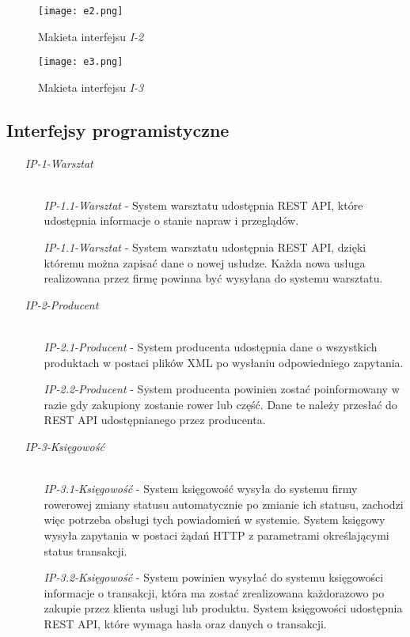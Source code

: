 \documentclass[a4paper,20pt]{article}
\begin{document}
\begin{figure}[H]
\centerline{\texttt{[image: e2.png]}}
\caption{Makieta interfejsu \textit{I-2}}
\label{e2}
\end{figure}

\begin{figure}[H]
\centerline{\texttt{[image: e3.png]}}
\caption{Makieta interfejsu \textit{I-3}}
\label{ekosys}
\end{figure}



\subsection{Interfejsy programistyczne}

\begin{itemize}

\item [\textit{IP-1-Warsztat \\}] \mbox{} \\
\begin{itemize}
\item [\textit{IP-1.1-Warsztat}] - System warsztatu udostępnia REST API, które udostępnia informacje o stanie napraw i przeglądów. 
\item [\textit{IP-1.1-Warsztat}] - System warsztatu udostępnia REST API, dzięki któremu można zapisać dane o nowej usłudze. Każda nowa usługa realizowana przez firmę powinna być wysyłana do systemu warsztatu.  
\end{itemize}


\item [\textit{IP-2-Producent \\}] \mbox{} \\
\begin{itemize}
\item [\textit{IP-2.1-Producent}] - System producenta udostępnia dane o wszystkich produktach w postaci plików XML po wysłaniu odpowiedniego zapytania. 
\item [\textit{IP-2.2-Producent}] - System producenta powinien zostać poinformowany w razie gdy zakupiony zostanie rower lub część. Dane te należy przesłać do REST API udostępnianego przez producenta.  
\end{itemize}


\item [\textit{IP-3-Księgowość \\}] \mbox{} \\
\begin{itemize}
\item [\textit{IP-3.1-Księgowość}] - System księgowość wysyła do systemu firmy rowerowej zmiany statusu automatycznie po zmianie ich statusu, zachodzi więc potrzeba obsługi tych powiadomień w systemie. System księgowy wysyła zapytania w postaci żądań HTTP z parametrami określającymi status transakcji. 
\item [\textit{IP-3.2-Księgowość}] - System powinien wysyłać do systemu księgowości informacje o transakcji, która ma zostać zrealizowana każdorazowo po zakupie przez klienta usługi lub produktu. System księgowości udostępnia REST API, które wymaga hasła oraz danych o transakcji.  
\end{itemize}



\end{itemize}
\end{document}
